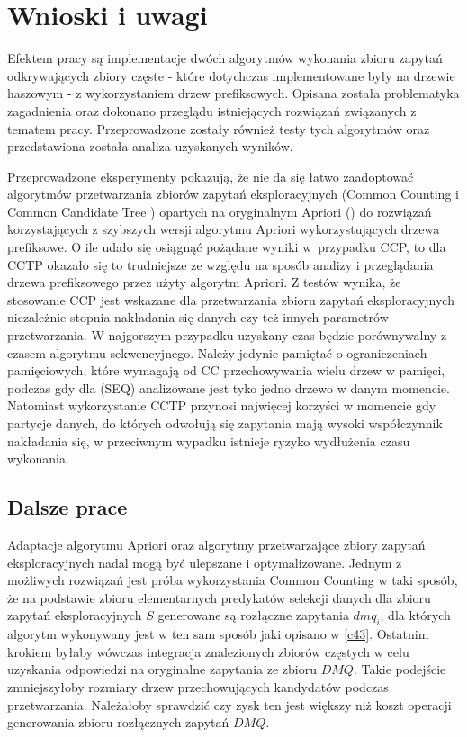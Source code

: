 \chapter{Wnioski i uwagi}

Efektem pracy są implementacje dwóch algorytmów wykonania zbioru zapytań odkrywających zbiory częste - które dotychczas implementowane były na drzewie haszowym - z wykorzystaniem drzew prefiksowych. Opisana została problematyka zagadnienia oraz dokonano przeglądu istniejących rozwiązań związanych z tematem pracy. Przeprowadzone zostały również testy tych algorytmów oraz przedstawiona została analiza uzyskanych wyników. 


Przeprowadzone eksperymenty pokazują, że nie da się łatwo zaadoptować algorytmów przetwarzania zbiorów zapytań eksploracyjnych (Common Counting \cite{WojciechowskiCC} i Common Candidate Tree \cite{WojciechowskiCCT}) opartych na oryginalnym Apriori (\cite{Agrawal}) do rozwiązań korzystających z szybszych wersji algorytmu Apriori wykorzystujących drzewa prefiksowe. O ile udało się osiągnąć pożądane wyniki w~przypadku CCP, to dla CCTP okazało się to trudniejsze ze względu na sposób analizy i przeglądania drzewa prefiksowego przez użyty algorytm Apriori. Z testów wynika, że stosowanie CCP jest wskazane dla przetwarzania zbioru zapytań eksploracyjnych niezależnie stopnia nakładania się danych czy też innych parametrów przetwarzania. W najgorszym przypadku uzyskany czas będzie porównywalny z czasem algorytmu sekwencyjnego. Należy jedynie pamiętać o ograniczeniach pamięciowych, które wymagają od CC przechowywania wielu drzew w pamięci, podczas gdy dla (SEQ) analizowane jest tyko jedno drzewo w danym momencie. Natomiast wykorzystanie CCTP przynosi najwięcej korzyści w momencie gdy partycje danych, do których odwołują się zapytania mają wysoki współczynnik nakładania się, w przeciwnym wypadku istnieje ryzyko wydłużenia czasu wykonania.




\section{Dalsze prace}
\label{c62}
Adaptacje algorytmu Apriori oraz algorytmy przetwarzające zbiory zapytań eksploracyjnych nadal mogą być ulepszane i optymalizowane. Jednym z możliwych rozwiązań jest próba wykorzystania Common Counting w taki sposób, że na podstawie zbioru elementarnych predykatów selekcji danych dla zbioru zapytań eksploracyjnych \(S\) generowane są rozłączne zapytania \(dmq_i\), dla których algorytm wykonywany jest w ten sam sposób jaki opisano w \ref{c43}. Ostatnim krokiem byłaby wówczas integracja znalezionych zbiorów częstych w celu uzyskania odpowiedzi na oryginalne zapytania ze zbioru \(DMQ\). Takie podejście zmniejszyłoby rozmiary drzew przechowujących kandydatów podczas przetwarzania. Należałoby sprawdzić czy zysk ten jest większy niż koszt operacji generowania zbioru rozłącznych zapytań \(DMQ\). 

